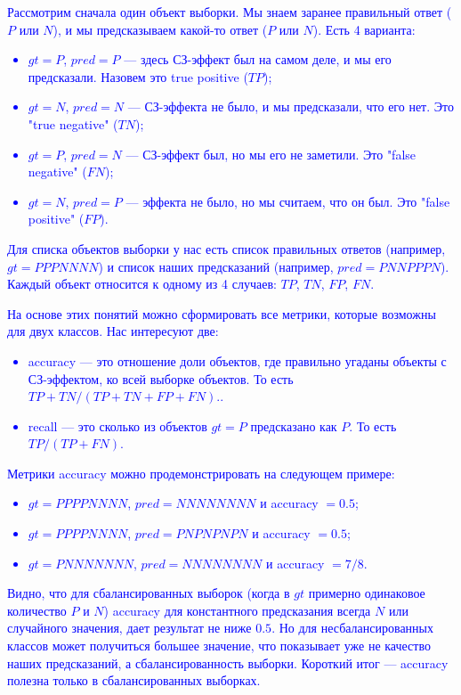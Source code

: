\documentclass[
aps,%
12pt,%
final,%
notitlepage,%
oneside,%
onecolumn,%
nobibnotes,%
nofootinbib,%
superscriptaddress,%
noshowpacs,%
centertags]%
{revtex4}
\begin{document}
\textcolor{blue}{Рассмотрим сначала один объект выборки. Мы знаем заранее правильный ответ ($P$ или $N$), и мы предсказываем какой-то ответ ($P$ или $N$). Есть 4 варианта:}
\textcolor{blue}{\begin{itemize}
    \item $gt = P$, $pred = P$ --- здесь СЗ-эффект был на самом деле, и мы его предсказали. Назовем это true positive ($TP$);
    \item $gt = N$, $pred = N$ --- СЗ-эффекта не было, и мы предсказали, что его нет. Это "true negative" ($TN$);
    \item $gt = P$, $pred = N$ --- СЗ-эффект был, но мы его не заметили. Это "false negative" ($FN$);
    \item$ gt = N$, $pred = P$ --- эффекта не было, но мы считаем, что он был. Это "false positive" ($FP$).
\end{itemize}}

\textcolor{blue}{Для списка объектов выборки у нас есть список правильных ответов (например, $gt=PPPNNNN$) и список наших предсказаний (например, $pred=PNNPPPN$). Каждый объект относится к одному из 4 случаев: $TP$, $TN$, $FP$, $FN$.} 

\textcolor{blue}{На основе этих понятий можно сформировать все метрики, которые возможны для двух классов. Нас интересуют две:
\begin{itemize}
    \item  accuracy --- это отношение доли объектов, где правильно угаданы объекты с СЗ-эффектом, ко всей выборке объектов. То есть $TP+TN/(TP+TN+FP+FN)$..
    \item recall --- это сколько из объектов $gt = P$ предсказано как $P$. То есть $TP/(TP+FN)$.
\end{itemize}}

\textcolor{blue}{Метрики accuracy можно продемонстрировать на следующем примере:
\begin{itemize}
  \item  $gt = PPPPNNNN$, $pred = NNNNNNNN$ и accuracy $= 0.5$;
  \item $gt = PPPPNNNN$, $pred = PNPNPNPN$ и accuracy $= 0.5$;
  \item $gt = PNNNNNNN$, $pred = NNNNNNNN$ и accuracy $= 7/8$.
\end{itemize}}
 
\textcolor{blue}{Видно, что для сбалансированных выборок (когда в $gt$ примерно одинаковое количество $P$ и $N$) accuracy для константного предсказания всегда $N$ или случайного значения, дает результат не ниже $0.5$.}
\textcolor{blue}{Но для несбалансированных классов может получиться большее значение, что показывает уже не качество наших предсказаний, а сбалансированность выборки. Короткий итог --- accuracy полезна только в сбалансированных выборках.}
\end{document}

